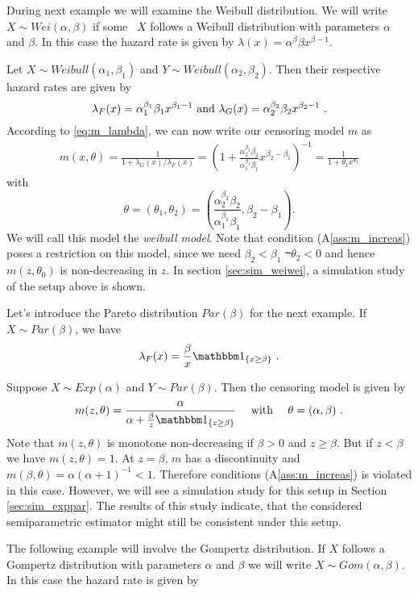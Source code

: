 %
During next example we will examine the Weibull distribution. We will write $X\sim Wei(\alpha, \beta)$ if some \rv\ $X$ follows a Weibull distribution with parameters $\alpha$ and $\beta$. In this case the hazard rate is given by $\lambda(x) = \alpha^{\beta}\beta x^{\beta-1}$.
\begin{example}
	Let $X \sim Weibull(\alpha_1, \beta_1)$ and $Y \sim Weibull(\alpha_2, \beta_2)$. Then their respective hazard rates are given by 
	$$\lambda_F(x) = \alpha_1^{\beta_1}\beta_1 x^{\beta_1-1} \textrm{ and } \lambda_G(x) = \alpha_2^{\beta_2}\beta_2 x^{\beta_2 -1}\textrm{ .}$$
	According to \eqref{eq:m_lambda}, we can now write our censoring model $m$ as 
	\begin{align*}
		m(x,\theta) = \frac{1}{1+\lambda_G(x)/\lambda_F(x)} =\left(1+\frac{\alpha_2^{\beta_2}\beta_2 }{\alpha_1^{\beta_1}\beta_1} x^{\beta_2-\beta_1}\right)^{-1} = \frac{1}{1+\theta_1 x^{\theta_2}}
	\end{align*}
	with
	$$\theta=(\theta_1,\theta_2)=\left(\frac{\alpha_2^{\beta_2}\beta_2 }{\alpha_1^{\beta_1}\beta_1},\beta_2-\beta_1\right)\textrm{.}$$
	We will call this model the \textit{weibull model}. Note that condition (A\ref{ass:m_increas}) poses a restriction on this model, since we need $\beta_2 < \beta_1$ \st\ $\theta_2 < 0$ and hence $m(z,\theta_0)$ is non-decreasing in $z$. In section \ref{sec:sim_weiwei}, a simulation study of the setup above is shown.
\end{example}
%
Let's introduce the Pareto distribution $Par(\beta)$ for the next example. If  $X\sim Par(\beta)$, we have
$$\lambda_F(x) = \frac{\beta}{x} \I{x\geq \beta}\mdot$$
\begin{example} \label{ex:exppar}
	Suppose $X\sim Exp(\alpha)$ and $Y\sim Par(\beta)$. Then the censoring model is given by
	$$m(z, \theta) =\frac{\alpha}{\alpha + \frac{\beta}{z} \I{z \geq \beta}} \quad\textrm{ with }\quad \theta = (\alpha, \beta)\mdot$$
	Note that $m(z,\theta)$ is monotone non-decreasing if $\beta>0$ and $z \geq \beta$. But if $z < \beta$ we have $m(z,\theta) = 1$. At $z=\beta$, $m$ has a discontinuity and $m(\beta, \theta) = \alpha(\alpha + 1)^{-1} < 1$. Therefore conditions (A\ref{ass:m_increas}) is violated in this case. However, we will see a simulation study for this setup in Section \ref{sec:sim_exppar}. The results of this study indicate, that the considered semiparametric estimator might still be consistent under this setup.
\end{example}
%
The following example will involve the Gompertz distribution. If $X$ follows a Gompertz distribution with parameters $\alpha$ and $\beta$ we will write $X\sim Gom(\alpha,\beta)$. In this case the hazard rate is given by
